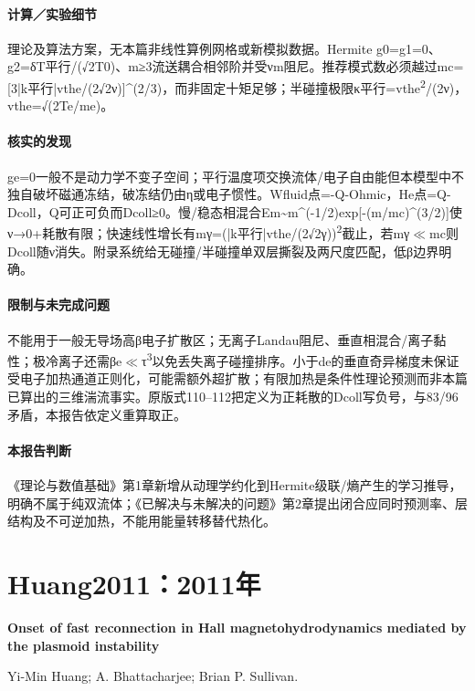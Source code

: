 \documentclass[UTF8,a4paper,11pt,openany,fontset=fandol]{ctexbook}
\begin{document}
\paragraph{计算／实验细节}理论及算法方案，无本篇非线性算例网格或新模拟数据。Hermite g0=g1=0、g2=δT平行/(√2T0)、m≥3流送耦合相邻阶并受νm阻尼。推荐模式数必须越过mc=[3|k平行|vthe/(2√2ν)]\textasciicircum{}(2/3)，而非固定十矩足够；半碰撞极限κ平行=vthe\textsuperscript{2}/(2ν)，vthe=√(2Te/me)。

\paragraph{核实的发现}ge=0一般不是动力学不变子空间；平行温度项交换流体/电子自由能但本模型中不独自破坏磁通冻结，破冻结仍由η或电子惯性。Wfluid点=-Q-Ohmic，He点=Q-Dcoll，Q可正可负而Dcoll≥0。慢/稳态相混合Em\textasciitilde{}m\textasciicircum{}(-1/2)exp[-(m/mc)\textasciicircum{}(3/2)]使ν→0+耗散有限；快速线性增长有mγ=(|k平行|vthe/(2√2γ))\textsuperscript{2}截止，若mγ\ensuremath{\ll}mc则Dcoll随ν消失。附录系统给无碰撞/半碰撞单双层撕裂及两尺度匹配，低β边界明确。

\paragraph{限制与未完成问题}不能用于一般无导场高β电子扩散区；无离子Landau阻尼、垂直相混合/离子黏性；极冷离子还需βe\ensuremath{\ll}τ\textsuperscript{3}以免丢失离子碰撞排序。小于de的垂直奇异梯度未保证受电子加热通道正则化，可能需额外超扩散；有限加热是条件性理论预测而非本篇已算出的三维湍流事实。原版式110–112把定义为正耗散的Dcoll写负号，与83/96矛盾，本报告依定义重算取正。

\paragraph{本报告判断}《理论与数值基础》第1章新增从动理学约化到Hermite级联/熵产生的学习推导，明确不属于纯双流体；《已解决与未解决的问题》第2章提出闭合应同时预测率、层结构及不可逆加热，不能用能量转移替代热化。

\section{Huang2011：2011年}\label{paper:Huang2011}

\textbf{Onset of fast reconnection in Hall magnetohydrodynamics mediated by the plasmoid instability}\citep{Huang2011}\

Yi-Min Huang;  A. Bhattacharjee;  Brian P. Sullivan.
\end{document}
